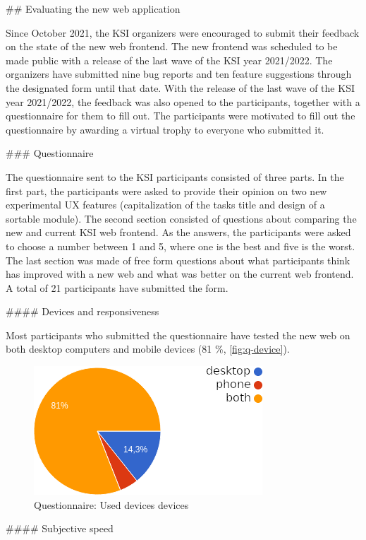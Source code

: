 \documentclass[
  digital, %
  oneside, %
  lof,     %
  nolot,     %
]{fithesis4}
\begin{document}
{## Evaluating the new web application

Since October 2021, the \acrshort{KSI} organizers were encouraged to submit their feedback on the state of the new web frontend. The new frontend was scheduled to be made public with a release of the last wave of the \acrshort{KSI} year 2021/2022. The organizers have submitted nine bug reports and ten feature suggestions through the designated form until that date. With the release of the last wave of the \acrshort{KSI} year 2021/2022, the feedback was also opened to the participants, together with a questionnaire for them to fill out. The participants were motivated to fill out the questionnaire by awarding a virtual trophy to everyone who submitted it.

### Questionnaire

The questionnaire sent to the \acrshort{KSI} participants consisted of three parts. In the first part, the participants were asked to provide their opinion on two new experimental \acrshort{UX} features (capitalization of the tasks title and design of a sortable module). The second section consisted of questions about comparing the new and current \acrshort{KSI} web frontend. As the answers, the participants were asked to choose a number between 1 and 5, where one is the best and five is the worst. The last section was made of free form questions about what participants think has improved with a new web and what was better on the current web frontend. A total of 21 participants have submitted the form.

#### Devices and responsiveness

Most participants who submitted the questionnaire have tested the new web on both desktop computers and mobile devices (81 \%, \autoref{fig:q-device}).

\begin{figure}
\includegraphics[width=.5\textwidth]{assets/img/questionare/device}
\caption{Questionnaire: Used devices devices}
\label{fig:q-device}
\end{figure}


#### Subjective speed

}
\end{document}
